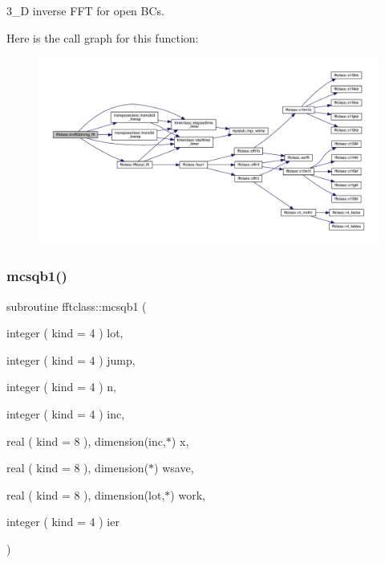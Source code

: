 3\+\_\+D inverse F\+FT for open B\+Cs. 

Here is the call graph for this function\+:\nopagebreak
\begin{figure}[H]
\begin{center}
\leavevmode
\includegraphics[width=350pt]{namespacefftclass_a374c599138aeca237d4c303a07a470ee_cgraph}
\end{center}
\end{figure}
\mbox{\label{namespacefftclass_a91e23ffaebaadf2b1c22e689f69996a2}} 
\subsubsection{\texorpdfstring{mcsqb1()}{mcsqb1()}}
{\footnotesize\ttfamily subroutine fftclass\+::mcsqb1 (\begin{DoxyParamCaption}\item[{integer ( kind = 4 )}]{lot,  }\item[{integer ( kind = 4 )}]{jump,  }\item[{integer ( kind = 4 )}]{n,  }\item[{integer ( kind = 4 )}]{inc,  }\item[{real ( kind = 8 ), dimension(inc,$\ast$)}]{x,  }\item[{real ( kind = 8 ), dimension($\ast$)}]{wsave,  }\item[{real ( kind = 8 ), dimension(lot,$\ast$)}]{work,  }\item[{integer ( kind = 4 )}]{ier }\end{DoxyParamCaption})}

